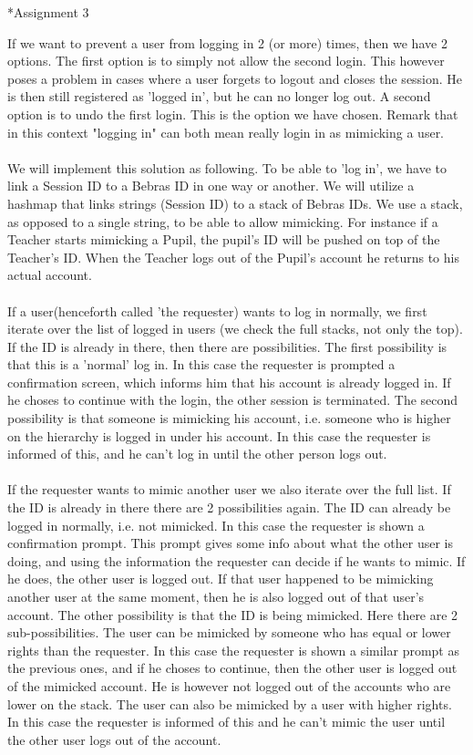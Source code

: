 
\begin{section}*{Assignment 3}

If we want to prevent a user from logging in 2 (or more) times, then we have 2 options. The first option is to simply not allow the second login. This however poses a problem in cases where a user forgets to logout and closes the session. He is then still registered as 'logged in', but he can no longer log out. A second option is to undo the first login. This is the option we have chosen. Remark that in this context "logging in" can both mean really login in as mimicking a user.
\\\\
We will implement this solution as following. To be able to 'log in', we have to link a Session ID to a Bebras ID in one way or another. We will utilize a hashmap that links strings (Session ID) to a stack of Bebras IDs. We use a stack, as opposed to a single string, to be able to allow mimicking. For instance if a Teacher starts mimicking a Pupil, the pupil's ID will be pushed on top of the Teacher's ID. When the Teacher logs out of the Pupil's account he returns to his actual account.
\\\\
If a user(henceforth called 'the requester) wants to log in normally, we first iterate over the list of logged in users (we check the full stacks, not only the top). If the ID is already in there, then there are possibilities. The first possibility is that this is a 'normal' log in. In this case the requester is prompted a confirmation screen, which informs him that his account is already logged in. If he choses to continue with the login, the other session is terminated. The second possibility is that someone is mimicking his account, i.e. someone who is higher on the hierarchy is logged in under his account. In this case the requester is informed of this, and he can't log in until the other person logs out.
\\\\
If the requester wants to mimic another user we also iterate over the full list. If the ID is already in there there are 2 possibilities again. The ID can already be logged in normally, i.e. not mimicked. In this case the requester is shown a confirmation prompt. This prompt gives some info about what the other user is doing, and using the information the requester can decide if he wants to mimic. If he does, the other user is logged out. If that user happened to be mimicking another user at the same moment, then he is also logged out of that user's account. The other possibility is that the ID is being mimicked. Here there are 2 sub-possibilities. The user can be mimicked by someone who has equal or lower rights than the requester. In this case the requester is shown a similar prompt as the previous ones, and if he choses to continue, then the other user is logged out of the mimicked account. He is however not logged out of the accounts who are lower on the stack. The user can also be mimicked by a user with higher rights. In this case the requester is informed of this and he can't mimic the user until the other user logs out of the account.

\end{section}
